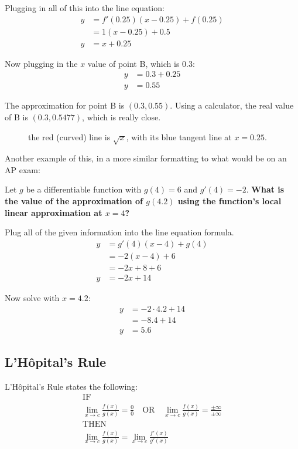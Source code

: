 \documentclass[12pt]{article}
\begin{document}
\noindent Plugging in all of this into the line equation:
\begin{align*}
    y & = f'(0.25)(x-0.25) + f(0.25) \\
      & = 1(x-0.25) + 0.5            \\
    y & = x+0.25
\end{align*}

\noindent Now plugging in the $x$ value of point B, which is $0.3$:
\begin{align*}
    y & = 0.3 + 0.25 \\
    y & = 0.55
\end{align*}

The approximation for point B is $(0.3, 0.55)$. Using a calculator, the real value of B is $(0.3, 0.5477)$, which is really close.

\begin{figure}[h]
    \begin{center}
        \caption{the red (curved) line is $\sqrt{x}$, with its blue tangent line at $x=0.25$.}
        \label{fig:locallinapprox}
    \end{center}
\end{figure}

Another example of this, in a more similar formatting to what would be on an AP exam:

\noindent Let $g$ be a differentiable function with $g(4) = 6$ and $g'(4) = -2$. \textbf{What is the value of the approximation of $g(4.2)$ using the function's local linear approximation at $x=4$?}

\begin{center}
    Plug all of the given information into the line equation formula.
    \begin{align*}
        y & = g'(4)(x-4) + g(4) \\
          & = -2(x-4) + 6       \\
          & = -2x + 8 + 6       \\
        y & = -2x + 14
    \end{align*}

    Now solve with $x=4.2$:
    \begin{align*}
        y & = -2 \cdot 4.2 + 14 \\
          & = -8.4 + 14         \\
        y & = 5.6
    \end{align*}
\end{center}

\subsection{L'Hôpital's Rule} %
\noindent L'Hôpital's Rule states the following:
\begin{gather*}
    \text{IF} \\
    \lim_{x \to c} \frac{f(x)}{g(x)} = \frac{0}{0} \quad \text{OR} \quad \lim_{x \to c} \frac{f(x)}{g(x)} = \frac{\pm \infty}{\pm \infty} \\[6pt]
    \text{THEN} \\
    \lim_{x \to c} \frac{f(x)}{g(x)} = \lim_{x \to c} \frac{f'(x)}{g'(x)}
\end{gather*}
\end{document}
